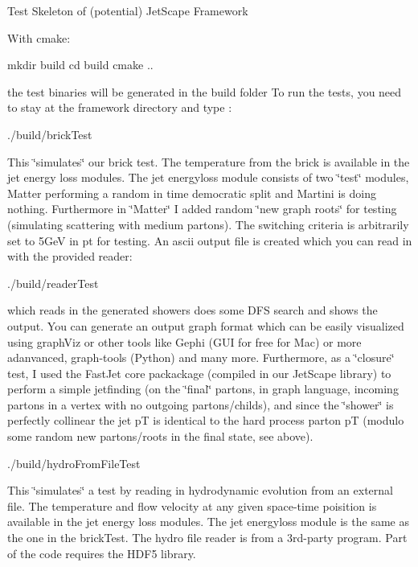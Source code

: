 Test Skeleton of (potential) Jet\+Scape Framework

With cmake\+:


\begin{DoxyCode}
mkdir build
cd build
cmake ..
\end{DoxyCode}


the test binaries will be generated in the build folder To run the tests, you need to stay at the framework directory and type \+:


\begin{DoxyCode}
./build/brickTest
\end{DoxyCode}


This \char`\"{}simulates\char`\"{} our brick test. The temperature from the brick is available in the jet energy loss modules. The jet energyloss module consists of two \char`\"{}test\char`\"{} modules, Matter performing a random in time democratic split and Martini is doing nothing. Furthermore in \char`\"{}\+Matter\char`\"{} I added random \char`\"{}new graph roots\char`\"{} for testing (simulating scattering with medium partons). The switching criteria is arbitrarily set to 5\+GeV in pt for testing. An ascii output file is created which you can read in with the provided reader\+:


\begin{DoxyCode}
./build/readerTest
\end{DoxyCode}


which reads in the generated showers does some D\+FS search and shows the output. You can generate an output graph format which can be easily visualized using graph\+Viz or other tools like Gephi (G\+UI for free for Mac) or more adanvanced, graph-\/tools (Python) and many more. Furthermore, as a \char`\"{}closure\char`\"{} test, I used the Fast\+Jet core packackage (compiled in our Jet\+Scape library) to perform a simple jetfinding (on the \char`\"{}final\char`\"{} partons, in graph language, incoming partons in a vertex with no outgoing partons/childs), and since the \char`\"{}shower\char`\"{} is perfectly collinear the jet pT is identical to the hard process parton pT (modulo some random new partons/roots in the final state, see above).


\begin{DoxyCode}
./build/hydroFromFileTest
\end{DoxyCode}


This \char`\"{}simulates\char`\"{} a test by reading in hydrodynamic evolution from an external file. The temperature and flow velocity at any given space-\/time poisition is available in the jet energy loss modules. The jet energyloss module is the same as the one in the brick\+Test. The hydro file reader is from a 3rd-\/party program. Part of the code requires the H\+D\+F5 library.


